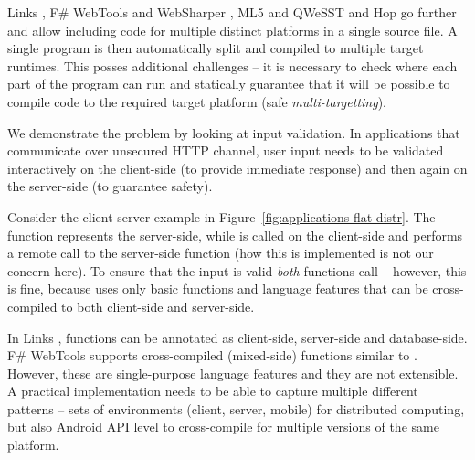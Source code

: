 Links \cite{app-distributed-links}, F\# WebTools and WebSharper \cite{app-fsharp-webapps,app-fsharp-webtools},
ML5 and QWeSST \cite{app-distributed-ml5, app-distributed-qwesst} and Hop \cite{app-hop-lang} go 
further and allow including code for multiple distinct platforms in a single source file. 
A single program is then automatically split and compiled to multiple target runtimes. This
posses additional challenges -- it is necessary to check where each part of the program can run
and statically guarantee that it will be possible to compile code to the required target 
platform (safe \emph{multi-targetting}).

We demonstrate the problem by looking at input validation. In applications that communicate over 
unsecured HTTP channel, user input needs to be validated interactively on the client-side (to 
provide immediate response) and then again on the server-side (to guarantee safety). 

Consider the client-server example in Figure~\ref{fig:applications-flat-distr}. The 
 function represents the server-side, while  is called 
on the client-side and performs a remote call to the server-side function (how this is implemented 
is not our concern here). To ensure that the input is valid \emph{both} functions call 
 -- however, this is fine, because  uses only basic
functions and language features that can be cross-compiled to both client-side and server-side.

In Links \cite{app-distributed-links}, functions can be annotated as client-side, server-side
and database-side. F\# WebTools \cite{app-fsharp-webtools} supports cross-compiled (mixed-side)
functions similar to . However, these are single-purpose language features 
and they are not extensible. A practical implementation needs to be able to capture multiple
different patterns -- sets of environments (client, server, mobile) for distributed computing,
but also Android API level \cite{app-android-multitarget} to cross-compile for multiple versions 
of the same platform.



